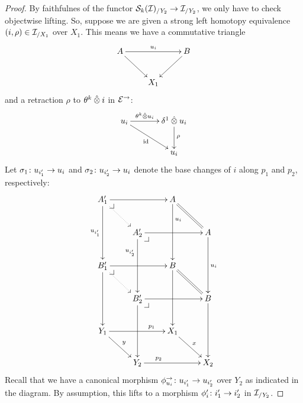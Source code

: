 \documentclass[reqno,10pt,a4paper,oneside,draft]{amsart}
\begin{document}
\begin{proof}
By faithfulnes of the functor $\cal{S}_k(\cal{I})_{/Y_2} \to \cal{I}_{/Y_2}$, we only have to check objectwise lifting.
So, suppose we are given a strong left homotopy equivalence $(i, \rho) \in \cal{I}_{/X_1}$ over $X_1$.
This means we have a commutative triangle
\[
\xymatrix{
  A
  \ar[rr]^{u_i}
  \ar[dr]
&&
  B
  \ar[dl]
\\&
  X_1
}
\]
and a retraction $\rho$ to $\thetak \hatotimes i$ in $\catE^\to$:
\[
\xymatrix@C+1em{
  u_i
  \ar[r]^-{\thetak \hatotimes u_i}
  \ar[dr]_{\id}
&
  \rcyl \hatotimes u_i \ar[d]^{\rho}
\\&
  u_i
}
\]
Let $\sigma_1 \co u_{i_1'} \to u_i$ and $\sigma_2 \co u_{i_2'} \to u_i$ denote the base changes of $i$ along $p_1$ and $p_2$, respectively:
\[
\xymatrix{
  A_1'
  \ar[rr]
  \ar[dd]_{u_{i_1'}}
  \pullback{dr}
  \ar@{.>}[dr]
&&
  A
  \ar[dd]^(0.3){u_i}
  \ar@{=}[dr]
\\&
  A_2'
  \ar[rr]
  \ar[dd]_(0.3){u_{i_2'}}
  \pullback{dr}
&&
  A
  \ar[dd]^{u_i}
\\
  B_1'
  \ar[rr]
  \ar[dd]
  \pullback{dr}
  \ar@{.>}[dr]
&&
  B
  \ar[dd]
  \ar@{=}[dr]
\\&
  B_2'
  \ar[rr]
  \ar[dd]
  \pullback{dr}
&&
  B
  \ar[dd]
\\
  Y_1
  \ar[rr]^(0.7){p_1}
  \ar[dr]^{y}
&&
  X_1
  \ar[dr]^{x}
\\&
  Y_2
  \ar[rr]^(0.3){p_2}
&&
  X_2
}
\]
Recall that we have a canonical morphism $\phi_{u_i}^\to \co u_{i_1'} \to u_{i_2'}$ over $Y_2$ as indicated in the diagram.
By assumption, this lifts to a morphism $\phi_i' \co i_1' \to i_2'$ in $\cal{I}_{/Y_2}$.


\end{proof}
\end{document}

